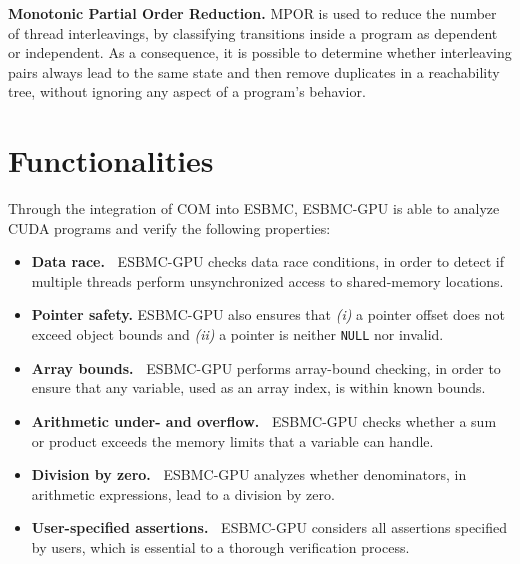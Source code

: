 \documentclass{llncs}
\begin{document}
\noindent \textbf{Monotonic Partial Order Reduction.} MPOR is used to reduce the number of thread interleavings, by classifying transitions inside a program as dependent or independent. As a consequence, it is possible to determine whether interleaving pairs always lead to the same state and then remove duplicates in a reachability tree, without ignoring any aspect of a program's behavior.


\section{Functionalities}
\label{sec:features}

Through the integration of COM into ESBMC, ESBMC-GPU is able to analyze CUDA programs and verify the following properties:

\begin{itemize}
	\item \textbf{Data race.\ } ESBMC-GPU checks data race conditions, in order to detect if multiple threads perform unsynchronized access to shared-memory locations.
	
	\item \textbf{Pointer safety. } ESBMC-GPU also ensures that {\it (i)} a pointer offset does not exceed object bounds and {\it (ii)} a pointer is neither {\tt NULL} nor invalid.
	
	\item \textbf{Array bounds.\ } ESBMC-GPU performs array-bound checking, in order to ensure that any variable, used as an array index, is within known bounds.
	
	\item \textbf{Arithmetic under- and overflow.\ } ESBMC-GPU checks whether a sum or product exceeds the memory limits that a variable can handle.%
	
	\item \textbf{Division by zero.\ } ESBMC-GPU analyzes whether denominators, in arithmetic expressions, lead to a division by zero.
	
	\item \textbf{User-specified assertions.\ } ESBMC-GPU considers all assertions specified by users, which is essential to a thorough verification process.%
\end{itemize}
\end{document}
